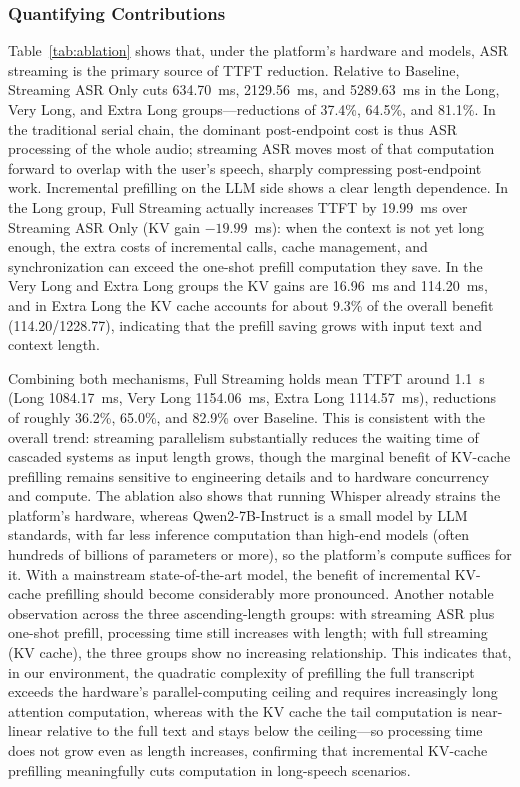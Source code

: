 \documentclass[conference]{IEEEtran}
\begin{document}
\subsubsection{Quantifying Contributions}

Table~\ref{tab:ablation} shows that, under the platform's hardware and models, ASR streaming is the primary source of TTFT reduction. Relative to Baseline, Streaming ASR Only cuts 634.70~ms, 2129.56~ms, and 5289.63~ms in the Long, Very Long, and Extra Long groups---reductions of 37.4\%, 64.5\%, and 81.1\%. In the traditional serial chain, the dominant post-endpoint cost is thus ASR processing of the whole audio; streaming ASR moves most of that computation forward to overlap with the user's speech, sharply compressing post-endpoint work. Incremental prefilling on the LLM side shows a clear length dependence. In the Long group, Full Streaming actually increases TTFT by 19.99~ms over Streaming ASR Only (KV gain $-19.99$~ms): when the context is not yet long enough, the extra costs of incremental calls, cache management, and synchronization can exceed the one-shot prefill computation they save. In the Very Long and Extra Long groups the KV gains are 16.96~ms and 114.20~ms, and in Extra Long the KV cache accounts for about 9.3\% of the overall benefit (114.20/1228.77), indicating that the prefill saving grows with input text and context length.

Combining both mechanisms, Full Streaming holds mean TTFT around 1.1~s (Long 1084.17~ms, Very Long 1154.06~ms, Extra Long 1114.57~ms), reductions of roughly 36.2\%, 65.0\%, and 82.9\% over Baseline. This is consistent with the overall trend: streaming parallelism substantially reduces the waiting time of cascaded systems as input length grows, though the marginal benefit of KV-cache prefilling remains sensitive to engineering details and to hardware concurrency and compute. The ablation also shows that running Whisper already strains the platform's hardware, whereas Qwen2-7B-Instruct is a small model by LLM standards, with far less inference computation than high-end models (often hundreds of billions of parameters or more), so the platform's compute suffices for it. With a mainstream state-of-the-art model, the benefit of incremental KV-cache prefilling should become considerably more pronounced. Another notable observation across the three ascending-length groups: with streaming ASR plus one-shot prefill, processing time still increases with length; with full streaming (KV cache), the three groups show no increasing relationship. This indicates that, in our environment, the quadratic complexity of prefilling the full transcript exceeds the hardware's parallel-computing ceiling and requires increasingly long attention computation, whereas with the KV cache the tail computation is near-linear relative to the full text and stays below the ceiling---so processing time does not grow even as length increases, confirming that incremental KV-cache prefilling meaningfully cuts computation in long-speech scenarios.
\end{document}
